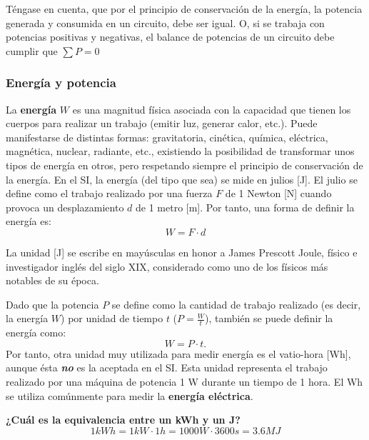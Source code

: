 \documentclass[11pt]{book} %
\begin{document}
	\begin{remark}
	    Téngase en cuenta, que por el principio de conservación de la energía, la potencia generada y consumida en un circuito, debe ser igual. O, si se trabaja con potencias positivas y negativas, el balance de potencias de un circuito debe cumplir que $\sum P=0$
	\end{remark}
	
	\subsubsection{Energía y potencia}
	
	La \textbf{energía} $W$ es una magnitud física asociada con la capacidad que tienen los cuerpos para realizar un trabajo (emitir luz, generar calor, etc.). Puede manifestarse de distintas formas: gravitatoria, cinética, química, eléctrica, magnética, nuclear, radiante, etc., existiendo la posibilidad de transformar unos tipos de energía en otros, pero respetando siempre el principio de conservación de la energía. En el SI, la energía (del tipo que sea) se mide en julios [J]. El julio se define como el trabajo realizado por una fuerza $F$ de 1 Newton [N] cuando provoca un desplazamiento $d$ de 1 metro [m]. Por tanto, una forma de definir la energía es:
	\begin{equation*}
		W=F\cdot d 
	\end{equation*}
	\begin{remark}
		La unidad [J] se escribe en mayúsculas en honor a James Prescott Joule, físico e investigador inglés del siglo XIX, considerado como uno de los físicos más notables de su época. 
	\end{remark}
	
	Dado que la potencia $P$ se define como la cantidad de trabajo realizado (es decir, la energía $W$) por unidad de tiempo $t$ ($P=\frac{W}{t}$), también se puede definir la energía como:
	\begin{equation*}\label{eq.Ept}
		W=P\cdot t.
	\end{equation*}
	Por tanto, otra unidad muy utilizada para medir energía es el vatio-hora [Wh], aunque ésta \textbf{\emph{no}} es la aceptada en el SI. Esta unidad representa el trabajo realizado por una máquina de potencia 1 W durante un tiempo de 1 hora. El Wh se utiliza comúnmente para medir la \textbf{energía eléctrica}. 
	
	\vspace{4mm}
	\begin{example}
		\textbf{¿Cuál es la equivalencia entre un kWh y un J?}
		\begin{equation*}
		    1 kWh = 1 kW \cdot 1 h = 1000 W \cdot 3600 s = 3.6 MJ 
		\end{equation*}
	\end{example}
	
\end{document}
